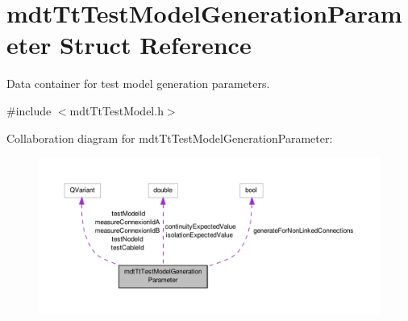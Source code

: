 \hypertarget{structmdt_tt_test_model_generation_parameter}{\section{mdt\-Tt\-Test\-Model\-Generation\-Parameter Struct Reference}
\label{structmdt_tt_test_model_generation_parameter}
}


Data container for test model generation parameters.  




{\ttfamily \#include $<$mdt\-Tt\-Test\-Model.\-h$>$}



Collaboration diagram for mdt\-Tt\-Test\-Model\-Generation\-Parameter\-:\nopagebreak
\begin{figure}[H]
\begin{center}
\leavevmode
\includegraphics[width=350pt]{structmdt_tt_test_model_generation_parameter__coll__graph}
\end{center}
\end{figure}
